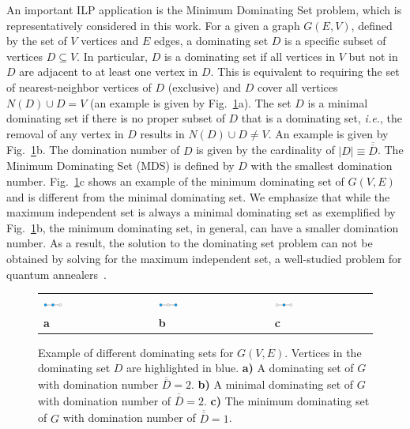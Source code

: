 \documentclass[prd,twocolumn,tightenlines,preprintnumbers,showpacs,superscriptaddress,notitlepage,nofootinbib,eqsecnum,floatfix,longbibliography,aps,10pt]{revtex4-2}
\begin{document}
An important ILP application is the Minimum Dominating Set problem, which is representatively considered in this work.
For a given a graph $G(E,V)$, defined by the set of $V$ vertices and $E$ edges, a dominating set $D$ is a specific subset of vertices $D \subseteq V$.
In particular, $D$ is a dominating set if all vertices in $V$ but not in $D$ are adjacent to at least one vertex in $D$.
This is equivalent to requiring the set of nearest-neighbor vertices of $D$ (exclusive) and $D$ cover all vertices $N(D) \cup D = V$ (an example is given by Fig.~\ref{fig:dominating_sets}a).
The set $D$ is a minimal dominating set if there is no proper subset of $D$ that is a dominating set, {\it{i.e.}}, the removal of any vertex in $D$ results in $N(D) \cup D  \neq V$.
An example is given by Fig.~\ref{fig:dominating_sets}b.
The domination number of $D$ is given by the cardinality of $|D| \equiv \overline{\overline{D}}$.
The Minimum Dominating Set (MDS) is defined by $D$ with the smallest domination number.
Fig.~\ref{fig:dominating_sets}c shows an example of the minimum dominating set of $G(V, E)$ and is different from the minimal dominating set.
We emphasize that while the maximum independent set is always a minimal dominating set as exemplified by Fig.~\ref{fig:dominating_sets}b, the minimum dominating set, in general, can have a smaller domination number.
As a result, the solution to the dominating set problem can not be obtained by solving for the maximum independent set, a well-studied problem for quantum annealers~{\color{red}\cite{}}.

\begin{figure}
	\centering
	\begin{tabular}{p{}p{}p{}p{}p{}}
	\includegraphics[width=0.2\textwidth]{./new_figures/MDS_mds0.pdf}
&&
	\includegraphics[width=0.2\textwidth]{./new_figures/MDS_mds1.pdf}
&&
	\includegraphics[width=0.2\textwidth]{./new_figures/MDS_mds2.pdf}\\
	\centering\textbf{a} && \centering\textbf{b} && \centering\textbf{c}
	\end{tabular}
	\caption{Example of different dominating sets for $G(V, E)$. Vertices in the dominating set $D$ are highlighted in blue. {\textbf{a)}} A dominating set of $G$ with domination number $\overline{\overline{D}} = 2$. {\textbf{b)}} A minimal dominating set of $G$ with domination number of $\overline{\overline{D}} = 2$. {\textbf{c)}} The minimum dominating set of $G$ with domination number of $\overline{\overline{D}} = 1$.}
	\label{fig:dominating_sets}
\end{figure}
\end{document}
